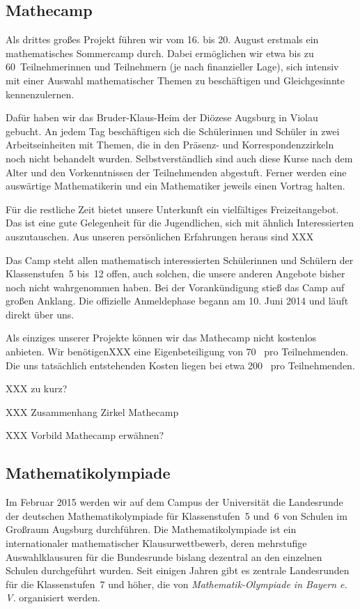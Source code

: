 \documentclass[12pt]{zettel}
\begin{document}
\subsection{Mathecamp}

Als drittes großes Projekt führen wir vom 16. bis 20. August erstmals ein
mathematisches Sommercamp durch. Dabei ermöglichen wir etwa bis zu 60~Teilnehmerinnen
und Teilnehmern (je nach finanzieller Lage), sich intensiv mit einer Auswahl mathematischer Themen zu
beschäftigen und Gleichgesinnte kennenzulernen.

Dafür haben wir das Bruder-Klaus-Heim der Diözese Augsburg in Violau
gebucht. An jedem Tag beschäftigen sich die Schülerinnen und Schüler in zwei
Arbeitseinheiten mit Themen, die in den Präsenz- und Korrespondenzzirkeln noch
nicht behandelt wurden. Selbstverständlich sind auch diese Kurse nach dem Alter
und den Vorkenntnissen der Teilnehmenden abgestuft. Ferner
werden eine auswärtige Mathematikerin und ein Mathematiker jeweils einen
Vortrag halten.

Für die restliche Zeit bietet unsere Unterkunft ein vielfältiges
Freizeitangebot. Das ist eine gute Gelegenheit für die Jugendlichen,
sich mit ähnlich Interessierten auszutauschen. Aus unseren persönlichen
Erfahrungen heraus sind XXX

Das Camp steht allen mathematisch interessierten Schülerinnen und Schülern der
Klassenstufen~5 bis~12 offen, auch solchen, die unsere anderen Angebote bisher
noch nicht wahrgenommen haben. Bei der Vorankündigung stieß das Camp auf großen
Anklang. Die offizielle Anmeldephase begann am 10. Juni 2014 und läuft direkt über uns.

Als einziges unserer Projekte können wir das Mathecamp nicht kostenlos
anbieten. Wir benötigenXXX eine Eigenbeteiligung von 70~\texteuro{} pro
Teilnehmenden. Die uns tatsächlich entstehenden Kosten liegen bei etwa
200~\texteuro{} pro Teilnehmenden.

XXX zu kurz?

XXX Zusammenhang Zirkel Mathecamp

XXX Vorbild Mathecamp erwähnen?

\subsection{Mathematikolympiade}

Im Februar 2015 werden wir auf dem Campus der Universität die Landesrunde der deutschen
Mathematikolympiade für Klassenstufen~5 und~6 von Schulen im Großraum
Augsburg durchführen. Die Mathematikolympiade ist ein internationaler mathematischer
Klausurwettbewerb, deren mehrstufige Auswahlklausuren für die Bundesrunde
bislang dezentral an den einzelnen Schulen durchgeführt wurden. Seit einigen
Jahren gibt es zentrale Landesrunden für die Klassenstufen~7 und höher, die von
\emph{Mathematik-Olympiade in Bayern e.\,V.} organisiert werden.
\end{document}
